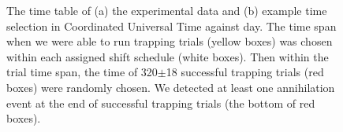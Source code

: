 \documentclass[superscriptaddress,aps,prb,11pt]{revtex4-1}
\begin{document}
\begin{figure}
\centering
  \caption{The time table of (a) the experimental data and (b) example time selection in Coordinated Universal Time against day. The time span when we were able to run trapping trials (yellow boxes) was chosen within each assigned shift schedule (white boxes). Then within the trial time span, the time of 320$\pm$18 successful trapping trials (red boxes) were randomly chosen. We detected at least one annihilation event at the end of successful trapping trials (the bottom of red boxes).}
  \label{fig:eventTime_date_sim}
\end{figure}
\end{document}
